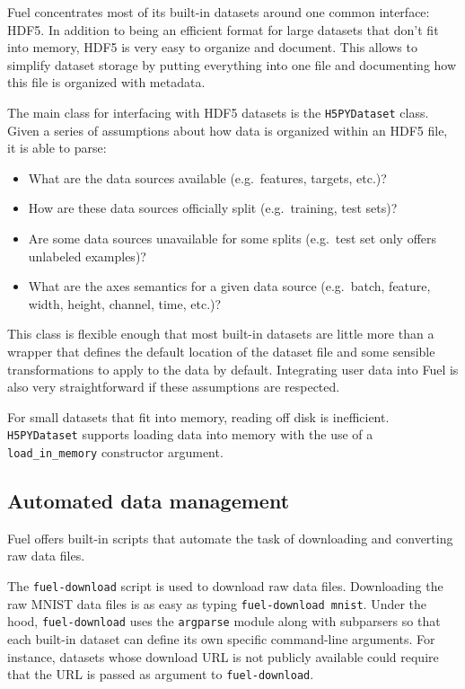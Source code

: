 \documentclass[twoside,11pt]{article}
\begin{document}
Fuel concentrates most of its built-in datasets around one common interface:
HDF5. In addition to being an efficient format for large datasets that don't
fit into memory, HDF5 is very easy to organize and document. This allows to
simplify dataset storage by putting everything into one file and documenting
how this file is organized with metadata.

The main class for interfacing with HDF5 datasets is the \lstinline$H5PYDataset$
class. Given a series of assumptions about how data is organized within an HDF5
file, it is able to parse:

\begin{itemize}
\item What are the data sources available (e.g.\ features, targets, etc.)?
\item How are these data sources officially split (e.g.\ training, test sets)?
\item Are some data sources unavailable for some splits (e.g.\ test set only
      offers unlabeled examples)?
\item What are the axes semantics for a given data source (e.g.\ batch, feature,
      width, height, channel, time, etc.)?
\end{itemize}


This class is flexible enough that most built-in datasets are little more than a
wrapper that defines the default location of the dataset file and some sensible
transformations to apply to the data by default. Integrating user data into Fuel
is also very straightforward if these assumptions are respected.

For small datasets that fit into memory, reading off disk is inefficient.
\lstinline$H5PYDataset$ supports loading data into memory with the use of a
\lstinline$load_in_memory$ constructor argument.

\subsection{Automated data management}

Fuel offers built-in scripts that automate the task of downloading and
converting raw data files.

The \lstinline$fuel-download$ script is used to download raw data files.
Downloading the raw MNIST data files is as easy as typing
\lstinline$fuel-download mnist$. Under the hood, \lstinline$fuel-download$ uses
the \lstinline$argparse$ module along with subparsers so that each built-in
dataset can define its own specific command-line arguments. For instance,
datasets whose download URL is not publicly available could require that
the URL is passed as argument to \lstinline$fuel-download$.
\end{document}
